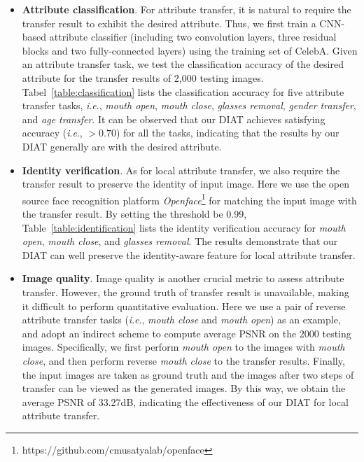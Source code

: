 \documentclass[journal]{IEEEtran}
\newcommand{\ie}{\textit{i}.\textit{e}.}
\begin{document}
\begin{itemize}
  \item \textbf{Attribute classification}. For attribute transfer, it is natural to require the transfer result to exhibit the desired attribute.
Thus, we first train a CNN-based attribute classifier (including two convolution layers, three residual blocks and two fully-connected layers) using the training set of CelebA.
Given an attribute transfer task, we test the classification accuracy of the desired attribute for the transfer results of 2,000 testing images.
Tabel~\ref{table:classification} lists the classification accuracy for five attribute transfer tasks, \ie, \emph{mouth open}, \emph{mouth close}, \emph{glasses removal}, \emph{gender transfer}, and \emph{age transfer}.
It can be observed that our DIAT achieves satisfying accuracy (\ie, $> 0.70$) for all the tasks, indicating that the results by our DIAT generally are with the desired attribute.
\item \textbf{Identity verification}. As for local attribute transfer, we also require the transfer result to preserve the identity of input image.
Here we use the open source face recognition platform \emph{Openface}\footnote{https://github.com/cmusatyalab/openface} for matching the input image with the transfer result.
By setting the threshold be 0.99, Table~\ref{table:identification} lists the identity verification accuracy for \emph{mouth open}, \emph{mouth close}, and \emph{glasses removal}.
The results demonstrate that our DIAT can well preserve the identity-aware feature for local attribute transfer.
\item \textbf{Image quality}.
Image quality is another crucial metric to assess attribute transfer.
However, the ground truth of transfer result is unavailable, making it difficult to perform quantitative evaluation.
Here we use a pair of reverse attribute transfer tasks (\ie, \emph{mouth close} and \emph{mouth open}) as an example, and adopt an indirect scheme to compute average PSNR on the 2000 testing images.
Specifically, we first perform \emph{mouth open} to the images with \emph{mouth close}, and then perform reverse \emph{mouth close} to the transfer results.
Finally, the input images are taken as ground truth and the images after two steps of transfer can be viewed as the generated images.
By this way, we obtain the average PSNR of 33.27dB, indicating the effectiveness of our DIAT for local attribute transfer.
\end{itemize}
\end{document}
